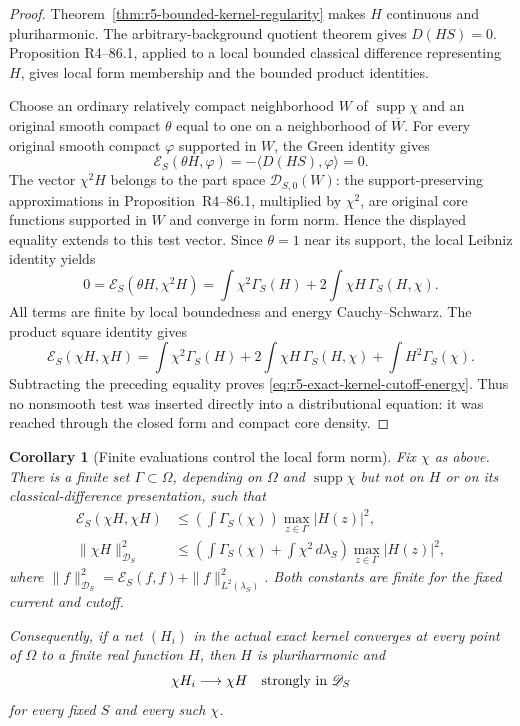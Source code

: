\documentclass[11pt,a4paper]{article}
\numberwithin{equation}{section}
\newtheorem{corollary}[theorem]{Corollary}
\theoremstyle{definition}
\theoremstyle{remark}
\begin{document}
\begin{proof}
Theorem~\ref{thm:r5-bounded-kernel-regularity} makes $H$
continuous and pluriharmonic.  The arbitrary-background quotient
theorem gives $D(HS)=0$.  Proposition
\textup{R4--86.1}, applied to a local bounded
classical difference representing $H$, gives local form
membership and the bounded product identities.

Choose an ordinary relatively compact neighborhood $W$ of
$\operatorname{supp}\chi$ and an original smooth compact
$\theta$ equal to one on a neighborhood of $\overline W$.
For every original smooth compact $\varphi$ supported in $W$,
the Green identity gives
\[
       \mathcal E_S(\theta H,\varphi)
                         =-\langle D(HS),\varphi\rangle=0.
\]
The vector $\chi^2H$ belongs to the part space
$\mathscr D_{S,0}(W)$: the support-preserving approximations in
Proposition~\textup{R4--86.1}, multiplied by
$\chi^2$, are original core functions supported in $W$ and
converge in form norm.  Hence the displayed equality extends to
this test vector.  Since $\theta=1$ near its support, the local
Leibniz identity yields
\[
 0=\mathcal E_S(\theta H,\chi^2H)
   =\int\chi^2\Gamma_S(H)
                       +2\int\chi H\,\Gamma_S(H,\chi).
\]
All terms are finite by local boundedness and energy
Cauchy--Schwarz.  The product square identity gives
\[
 \mathcal E_S(\chi H,\chi H)
   =\int\chi^2\Gamma_S(H)
       +2\int\chi H\,\Gamma_S(H,\chi)
       +\int H^2\Gamma_S(\chi).
\]
Subtracting the preceding equality proves
\eqref{eq:r5-exact-kernel-cutoff-energy}.  Thus no nonsmooth
test was inserted directly into a distributional equation:
it was reached through the closed form and compact core density.
\end{proof}

\begin{corollary}[Finite evaluations control the local form norm]
\label{cor:r5-exact-kernel-energy-stability}
Fix $\chi$ as above.  There is a finite set
$\Gamma\subset\Omega$, depending on $\Omega$ and
$\operatorname{supp}\chi$ but not on $H$ or on its
classical-difference presentation, such that
\begin{equation}
 \begin{split}
  \mathcal E_S(\chi H,\chi H)
       &\leq\left(\int\Gamma_S(\chi)\right)
                              \max_{z\in\Gamma}|H(z)|^2,\\
  \|\chi H\|_{\mathscr D_S}^2
       &\leq\left(\int\Gamma_S(\chi)+\int\chi^2\,d\lambda_S\right)
                              \max_{z\in\Gamma}|H(z)|^2,
 \end{split}
 \label{eq:r5-exact-kernel-energy-control}
\end{equation}
where
$\|f\|_{\mathscr D_S}^2=\mathcal E_S(f,f)+\|f\|_{L^2(\lambda_S)}^2$.
Both constants are finite for the fixed current and cutoff.

Consequently, if a net $(H_i)$ in the actual exact kernel
converges at every point of $\Omega$ to a finite real function
$H$, then $H$ is pluriharmonic and
\[
                     \chi H_i\longrightarrow\chi H
                             \quad\hbox{strongly in }\mathscr D_S
\]
for every fixed $S$ and every such $\chi$.
\end{corollary}
\end{document}
